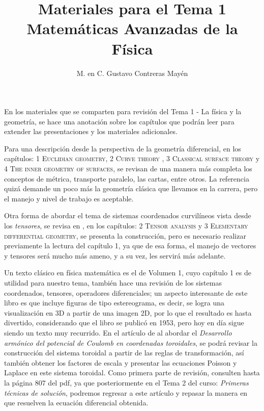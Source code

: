 
\usepackage{apacite}
\renewcommand{\refname}{Bibliografía.}
% 
\title{Materiales para el Tema 1\\ \large{Matemáticas Avanzadas de la Física}\vspace{-3ex}}
\author{M. en C. Gustavo Contreras Mayén}
\date{ }

\vspace{-4cm}
\maketitle
\fontsize{14}{14}\selectfont
En los materiales que se comparten para revisión del Tema 1 - La física y la geometría, se hace una anotación sobre los capítulos que podrán leer para extender las presentaciones y los materiales adicionales.
\par
Para una descripción desde la perspectiva de la geometría diferencial, en \cite{Bar2010} los capítulos: 1 \textsc{Euclidian geometry}, 2 \textsc{Curve theory} , 3 \textsc{Classical surface theory} y 4 \textsc{The inner geometry of surfaces}, se revisan de una manera más completa los conceptos de métrica, transporte paralelo, las cartas, entre otros. La referencia quizá demande un poco más la geometría clásica que llevamos en la carrera, pero el manejo y nivel de trabajo es aceptable.
\par
Otra forma de abordar el tema de sistemas coordenados curvilíneos vista desde los \emph{tensores}, se revisa en \cite{Nguyen2017}, en los capítulos: 2 \textsc{Tensor analysis} y 3 \textsc{Elementary differential geometry}, se presenta la construcción, pero es necesario realizar previamente la lectura del capítulo 1, ya que de esa forma, el manejo de vectores y tensores será mucho más ameno, y a su vez, les servirá más adelante.
\par
Un texto clásico en física matemática es el de \cite{Morse1953} Volumen 1, cuyo capítulo 1 es de utilidad para nuestro tema, también hace una revisión de los sistemas coordenados, tensores, operadores diferenciales; un aspecto interesante de este libro es que incluye figuras de tipo estereograma, es decir, se logra una visualización en 3D a partir de una imagen 2D, por lo que el resultado es hasta divertido, considerando que el libro se publicó en 1953, pero hoy en día sigue siendo un texto muy recurrido.
En el artículo de \cite{LeyKoo1994} al abordar el \emph{Desarrollo armónico del potencial de Coulomb en coordenadas toroidales}, se podrá revisar la construcción del sistema toroidal a partir de las reglas de transformación, así también obtener los factores de escala y presentar las ecuaciones Poisson y Laplace en este sistema toroidal. Como primera parte de revisión, consulten hasta la página $807$ del pdf, ya que posteriormente en el Tema 2 del curso: \emph{Primeras técnicas de solución}, podremos regresar a este artículo y repasar la manera en que resuelven la ecuación diferencial obtenida.
